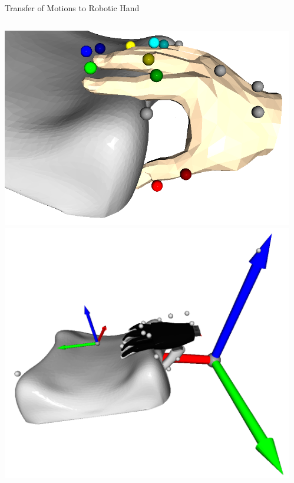 \documentclass[14pt]{beamer}
\begin{document}
\begin{frame}[fragile]{Transfer of Motions to Robotic Hand}
\begin{columns}
\begin{column}{0.4\textwidth}
\includegraphics[width=\textwidth]{images/embodiment_record}
\includegraphics[width=\textwidth]{images/embodiment_mia}
\end{column}
\begin{column}{0.6\textwidth}

\end{column}
\end{columns}
\end{frame}
\end{document}
